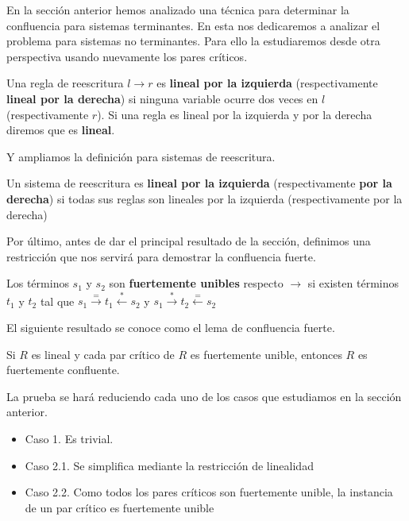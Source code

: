 En la sección anterior hemos analizado una técnica para determinar la
confluencia para sistemas terminantes. En esta nos dedicaremos a
analizar el problema para sistemas no terminantes. Para ello la
estudiaremos desde otra perspectiva usando nuevamente los pares
críticos.

\begin{defi}
  Una regla de reescritura $l \rightarrow r$ es \textbf{lineal por la
  izquierda} (respectivamente \textbf{lineal por la derecha}) si ninguna
  variable ocurre dos veces en $l$ (respectivamente $r$). Si una regla
  es lineal por la izquierda y por la derecha diremos que es \textbf{lineal}. 
\end{defi}

Y ampliamos la definición para sistemas de reescritura.

\begin{defi}
  Un sistema de reescritura es \textbf{lineal por la izquierda}
  (respectivamente \textbf{por la derecha}) si todas sus reglas son lineales por
  la izquierda (respectivamente por la derecha)
\end{defi}

Por último, antes de dar el principal resultado de la sección,
definimos una restricción que nos servirá para demostrar la
confluencia fuerte.

\begin{defi}
  Los términos $s_1$ y $s_2$ son \textbf{fuertemente unibles} respecto
  $\rightarrow$ si existen términos $t_1$ y $t_2$ tal que
  $s_1 \xrightarrow{=} t_1 \xleftarrow{*} s_2$ y $s_1 \xrightarrow{*}
  t_2 \xleftarrow{=} s_2$
\end{defi}


El siguiente resultado se conoce como el lema de confluencia fuerte.

\begin{lema}
  Si $R$ es lineal y cada par crítico de $R$ es fuertemente unible,
  entonces $R$ es fuertemente confluente.
\end{lema}

\begin{demo}
  La prueba se hará reduciendo cada uno de los casos que estudiamos en
  la sección anterior.
  
  \begin{itemize}
    
  \item Caso 1. Es trivial.

  \item Caso 2.1. Se simplifica mediante la restricción de linealidad

  \item Caso 2.2. Como todos los pares críticos son fuertemente
    unible, la instancia de un par crítico es fuertemente unible

  \end{itemize}

\end{demo}

